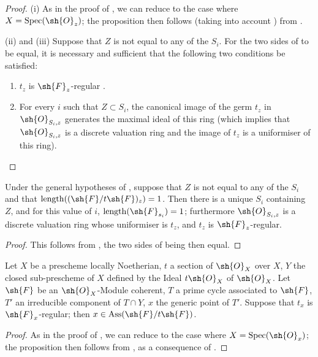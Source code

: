 \begin{proof}
(i) As in the proof of , we can reduce to the case where $X=\operatorname{Spec}(\sh{O}_z)$; the proposition then follows (taking into account ) from .

(ii) and (iii) Suppose that $Z$ is not equal to any of the $S_i$.
For the two sides of  to be equal, it is necessary and sufficient that the following two conditions be satisfied:
\begin{enumerate}[label=\rm$\alpha$)]
  \item $t_z$ is $\sh{F}_z$-regular .
  \item For every $i$ such that $Z\subset S_i$, the canonical image of the germ $t_z$ in $\sh{O}_{S_i,z}$ generates the maximal ideal of this ring (which implies that $\sh{O}_{S_i,z}$ is a discrete valuation ring and the image of $t_z$ is a uniformiser of this ring).
\end{enumerate}
\end{proof}

\begin{corollary}[3.4.2]
\label{IV.3.4.2}
Under the general hypotheses of , suppose that $Z$ is not equal to any of the $S_i$ and that $\operatorname{length}((\sh{F}/t\sh{F})_z)=1$.
Then there is a unique $S_i$ containing $Z$, and for this value of $i$, $\operatorname{length}(\sh{F}_{s_i})=1$; furthermore $\sh{O}_{S_i,z}$ is a discrete valuation ring whose uniformiser is $t_z$, and $t_z$ is $\sh{F}_z$-regular.
\end{corollary}

\begin{proof}
This follows from , the two sides of  being then equal.
\end{proof}

\begin{proposition}[3.4.3]
\label{IV.3.4.3}
Let $X$ be a prescheme locally Noetherian, $t$ a section of $\sh{O}_X$ over $X$, $Y$ the closed sub-prescheme of $X$ defined by the Ideal $t\sh{O}_X$ of $\sh{O}_X$.
Let $\sh{F}$ be an $\sh{O}_X$-Module coherent, $T$ a prime cycle associated to $\sh{F}$, $T'$ an irreducible component of $T\cap Y$, $x$ the generic point of $T'$.
Suppose that $t_x$ is $\sh{F}_x$-regular; then $x\in\operatorname{Ass}(\sh{F}/t\sh{F})$.
\end{proposition}

\begin{proof}
As in the proof of , we can reduce to the case where $X=\operatorname{Spec}(\sh{O}_x)$; the proposition then follows from , as a consequence of .
\end{proof}

